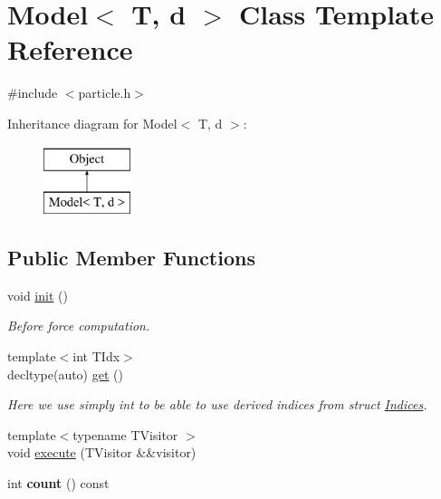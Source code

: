 \hypertarget{classModel}{}\section{Model$<$ T, d $>$ Class Template Reference}
\label{classModel}


{\ttfamily \#include $<$particle.\+h$>$}

Inheritance diagram for Model$<$ T, d $>$\+:\begin{figure}[H]
\begin{center}
\leavevmode
\includegraphics[height=2.000000cm]{classModel}
\end{center}
\end{figure}
\subsection*{Public Member Functions}
\begin{DoxyCompactItemize}
\item 
\hypertarget{classModel_a1a187b074f90554645f8565ca7e786e3}{}\label{classModel_a1a187b074f90554645f8565ca7e786e3} 
void \hyperlink{classModel_a1a187b074f90554645f8565ca7e786e3}{init} ()
\begin{DoxyCompactList}\small\item\em Before force computation. \end{DoxyCompactList}\item 
\hypertarget{classModel_a4de6ed58a73baf4b2dab27a821f84935}{}\label{classModel_a4de6ed58a73baf4b2dab27a821f84935} 
{\footnotesize template$<$int T\+Idx$>$ }\\decltype(auto) \hyperlink{classModel_a4de6ed58a73baf4b2dab27a821f84935}{get} ()
\begin{DoxyCompactList}\small\item\em Here we use simply int to be able to use derived indices from struct \hyperlink{structIndices}{Indices}. \end{DoxyCompactList}\item 
{\footnotesize template$<$typename T\+Visitor $>$ }\\void \hyperlink{classModel_a9cfb34e778da5c1b6a44929ca2430c34}{execute} (T\+Visitor \&\&visitor)
\item 
\hypertarget{classModel_a506809365df98c68196c0e95c9349de2}{}\label{classModel_a506809365df98c68196c0e95c9349de2} 
int {\bfseries count} () const
\end{DoxyCompactItemize}
